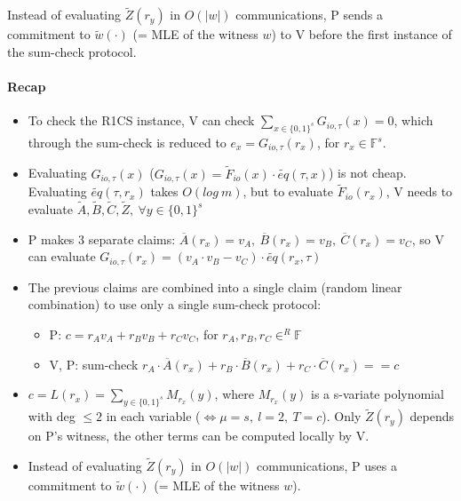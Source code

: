 \documentclass{article}
\theoremstyle{definition}
\begin{document}
Instead of evaluating $\widetilde{Z}(r_y)$ in $O(|w|)$ communications, P sends a commitment to $\widetilde{w}(\cdot)$ (= MLE of the witness $w$) to V before the first instance of the sum-check protocol.


\paragraph{Recap}
\begin{itemize}
	\item[] To check the R1CS instance, V can check $\sum_{x \in \{0,1\}^s} G_{io, \tau} (x) = 0$, which through the sum-check is reduced to $e_x = G_{io, \tau} (r_x)$, for $r_x \in \mathbb{F}^s$.
	\item[] Evaluating $G_{io, \tau}(x)$ ($G_{io, \tau}(x) = \widetilde{F}_{io}(x) \cdot \widetilde{eq}(\tau, x)$) is not cheap. Evaluating $\widetilde{eq}(\tau, r_x)$ takes $O(log~m)$, but to evaluate $\widetilde{F}_{io}(r_x)$, V needs to evaluate $\widetilde{A}, \widetilde{B}, \widetilde{C}, \widetilde{Z},~ \forall y \in \{0,1\}^s$
	\item[] P makes 3 separate claims: $\overline{A}(r_x)=v_A,~ \overline{B}(r_x)=v_B,~ \overline{C}(r_x)=v_C$, so V can evaluate $G_{io, \tau}(r_x) = (v_A \cdot v_B - v_C) \cdot \widetilde{eq}(r_x, \tau)$
	\item[] The previous claims are combined into a single claim (random linear combination) to use only a single sum-check protocol:
		\begin{itemize}
			\item[] P: $c= r_A v_A + r_B v_B + r_C v_C$, for $r_A, r_B, r_C \in^R \mathbb{F}$
			\item[] V, P: sum-check $r_A \cdot \overline{A}(r_x) + r_B \cdot \overline{B}(r_x) + r_C \cdot \overline{C}(r_x) == c$
		\end{itemize}
	\item[] $c=L(r_x)=\sum_{y \in \{0,1\}^s} M_{r_x}(y)$, where $M_{r_x}(y)$ is a s-variate polynomial with deg $\leq 2$ in each variable ($\Longleftrightarrow \mu = s,~ l=2,~ T=c$). Only $\widetilde{Z}(r_y)$ depends on P's witness, the other terms can be computed locally by V.
	\item[] Instead of evaluating $\widetilde{Z}(r_y)$ in $O(|w|)$ communications, P uses a commitment to $\widetilde{w}(\cdot)$ (= MLE of the witness $w$).
\end{itemize}
\end{document}
